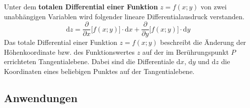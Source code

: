 \newline\newline
Unter dem \textbf{totalen Differential einer Funktion} $z=f\left(x; y\right)$ von zwei unabhängigen Variablen wird folgender lineare Differentialausdruck verstanden.  
\begin{equation}
\boxed{\text{d}z=\dfrac{\partial}{\partial x}\Big[f\left(x; y\right)\Big]\cdot \text{d}x+\dfrac{\partial}{\partial y}\Big[f\left(x; y\right)\Big]\cdot \text{d}y}
\end{equation}
Das totale Differential einer Funktion $z=f\left(x; y\right)$ beschreibt die Änderung der Höhenkoordinate bzw. des Funktionswertes $z$ auf der im Berührungspunkt $P$ errichteten Tangentialebene. Dabei sind die Differentiale $\text{d}x$, $\text{d}y$ und $\text{d}z$ die Koordinaten eines beliebigen Punktes auf der Tangentialebene.
\subsection{Anwendungen}
